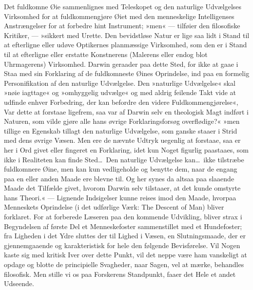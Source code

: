 \documentclass[12pt,a4paper]{article}
\newcommand{\apage}[1]{\marginnote{\footnotesize\textit{[#1]}}}
\begin{document}
Det fuldkomne Øie sammenlignes med Teleskopet og den naturlige
Udvælgelses Virksomhed for at fuldkommengjøre Øiet med den menneskelige
Intelligenses Anstrængelser for at forbedre hint Instrument; »men« ---
tilføier den filosofiske Kritiker, --- »sikkert med Urette. Den bevidstløse
Natur er lige saa lidt i Stand til at efterligne eller udøve Optikernes
planmæssige Virksomhed, som den
\apage{452}er i Stand til at efterligne eller erstatte Konstnerens (Malerens eller
endog blot Uhrmagerens) Virksomhed. Darwin geraader paa dette Sted,
for ikke at gaae i Staa med sin Forklaring af de fuldkomneste Øines
Oprindelse, ind paa en formelig Personifikation af den naturlige
Udvælgelse. Den »naturlige Udvælgelse« skal »nøie iagttage« og
»omhyggelig udvælge« og med aldrig feilende Takt vide at udfinde
enhver Forbedring, der kan befordre den videre Fuldkommengjørelse«,
Var dette at forstaae ligefrem, saa var af Darwin selv en theologisk
Magt indført i Naturen, som vilde gjøre alle hans øvrige
Forklaringsforsøg overflødige?« »men tillige en Egenskab tillagt den
naturlige Udvælgelse, som ganske staaer i Strid med dens øvrige Væsen.
Men ere de nævnte Udtryk uegenlig at forstaae, saa er her i Ord givet
eller fingeret en Forklaring, idet kun Noget figurlig paastaaes, som
ikke i Realiteten kan finde Sted\ldots\ Den naturlige Udvælgelse
kan\ldots\ ikke tilstræbe fuldkomnere Øine, men kan kun vedligeholde
og benytte dem, naar de engang paa en eller anden Maade ere blevne
til. Og her synes da altsaa paa slaaende Maade det Tilfælde givet,
hvorom Darwin selv tilstaaer, at det kunde omstyrte hans Theori.« ---
Lignende Indsigelser kunne reises imod den Maade, hvorpaa Menneskets
Oprindelse (i det udførlige Værk: The Descent of Man) bliver
forklaret. For at forberede Læseren paa den kommende Udvikling, bliver
strax i Begyndelsen af første Del et Menneskefoster sammenstillet med
et Hundefoster; fra Ligheden i det Ydre sluttes der til Lighed i
Væsen, en Slutningsmaade, der er gjennemgaaende og karakteristisk for
hele den følgende Bevisførelse. Vil Nogen kaste sig med kritisk Iver
over dette Punkt, vil
\apage{453}det neppe være ham vanskeligt at opdage og blotte de principielle
Svagheder, naar Sagen, vel at mærke, behandles filosofisk.
Men stille vi os paa Forskerens Standpunkt, faaer det Hele et andet
Udseende.
\end{document}

